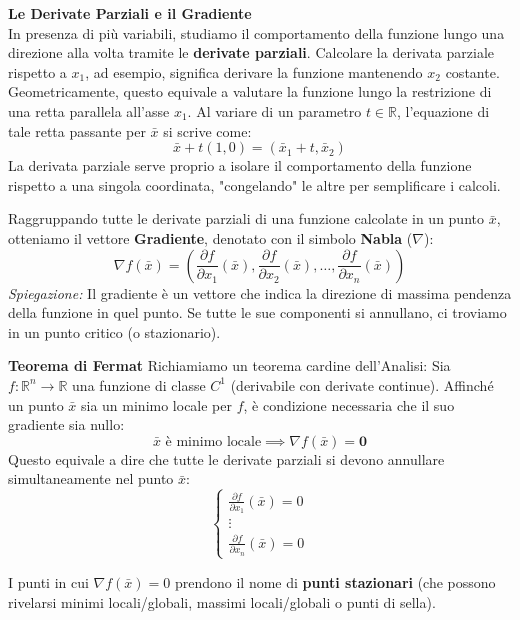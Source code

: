 \documentclass[12pt, a4paper]{article}
\newcommand{\separatore}{\noindent{\color{titlecolor!50}\rule{\textwidth}{0.6pt}}}
\begin{document}
	\textbf{Le Derivate Parziali e il Gradiente}\\
	In presenza di più variabili, studiamo il comportamento della funzione lungo una direzione alla volta tramite le \textbf{derivate parziali}. Calcolare la derivata parziale rispetto a $x_1$, ad esempio, significa derivare la funzione mantenendo $x_2$ costante.
	Geometricamente, questo equivale a valutare la funzione lungo la restrizione di una retta parallela all'asse $x_1$. Al variare di un parametro $t \in \mathbb{R}$, l'equazione di tale retta passante per $\bar{x}$ si scrive come:
	\[ \bar{x} + t(1,0) = (\bar{x}_1 + t, \bar{x}_2) \]
	La derivata parziale serve proprio a isolare il comportamento della funzione rispetto a una singola coordinata, "congelando" le altre per semplificare i calcoli.
	
	Raggruppando tutte le derivate parziali di una funzione calcolate in un punto $\bar{x}$, otteniamo il vettore \textbf{Gradiente}, denotato con il simbolo \textbf{Nabla} ($\nabla$):
	\[ \nabla f(\bar{x}) = \left( \frac{\partial f}{\partial x_1}(\bar{x}), \frac{\partial f}{\partial x_2}(\bar{x}), \dots, \frac{\partial f}{\partial x_n}(\bar{x}) \right) \]
	\textit{Spiegazione:} Il gradiente è un vettore che indica la direzione di massima pendenza della funzione in quel punto. Se tutte le sue componenti si annullano, ci troviamo in un punto critico (o stazionario).
	
	\vspace{0.4cm}
	\separatore
	\vspace{0.4cm}
	
	\textbf{Teorema di Fermat}
	Richiamiamo un teorema cardine dell'Analisi:
	Sia $f : \mathbb{R}^n \to \mathbb{R}$ una funzione di classe $C^1$ (derivabile con derivate continue). Affinché un punto $\bar{x}$ sia un minimo locale per $f$, è condizione necessaria che il suo gradiente sia nullo:
	\[ \bar{x} \text{ è minimo locale} \implies \nabla f(\bar{x}) = \mathbf{0} \]
	Questo equivale a dire che tutte le derivate parziali si devono annullare simultaneamente nel punto $\bar{x}$:
	\[
	\begin{cases}
		\frac{\partial f}{\partial x_1}(\bar{x}) = 0 \\
		\vdots \\
		\frac{\partial f}{\partial x_n}(\bar{x}) = 0
	\end{cases}
	\]
	
	I punti in cui $\nabla f(\bar{x}) = 0$ prendono il nome di \textbf{punti stazionari} (che possono rivelarsi minimi locali/globali, massimi locali/globali o punti di sella). 
	
\end{document}
